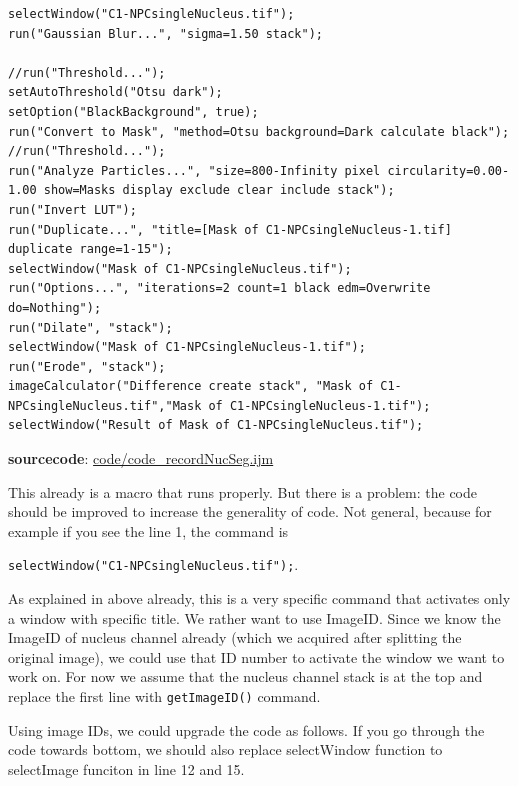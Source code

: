 \documentclass[11pt,a4paper,oneside]{report}
\newcommand{\ilcom}[1]{\texttt{\small#1}}
\begin{document}
\begin{lstlisting}
selectWindow("C1-NPCsingleNucleus.tif");
run("Gaussian Blur...", "sigma=1.50 stack");

//run("Threshold...");
setAutoThreshold("Otsu dark");
setOption("BlackBackground", true);
run("Convert to Mask", "method=Otsu background=Dark calculate black");
//run("Threshold...");
run("Analyze Particles...", "size=800-Infinity pixel circularity=0.00-1.00 show=Masks display exclude clear include stack");
run("Invert LUT");
run("Duplicate...", "title=[Mask of C1-NPCsingleNucleus-1.tif] duplicate range=1-15");
selectWindow("Mask of C1-NPCsingleNucleus.tif");
run("Options...", "iterations=2 count=1 black edm=Overwrite do=Nothing");
run("Dilate", "stack");
selectWindow("Mask of C1-NPCsingleNucleus-1.tif");
run("Erode", "stack");
imageCalculator("Difference create stack", "Mask of C1-NPCsingleNucleus.tif","Mask of C1-NPCsingleNucleus-1.tif");
selectWindow("Result of Mask of C1-NPCsingleNucleus.tif");

\end{lstlisting}
\textbf{sourcecode}: \href{http://www.example.com/contents}{code/code\_recordNucSeg.ijm}

This already is a macro that runs properly. But there is a problem: the code should be improved to increase the generality of code. Not general, because for example if you see the line 1, the command is 

\ilcom{selectWindow("C1-NPCsingleNucleus.tif");}. 


As explained in above already, this is a very specific command that activates only a window with specific title. We rather want to use ImageID. Since we know the ImageID of nucleus channel already (which we acquired after splitting the original image), we could use that ID number to activate the window we want to work on. For now we assume that the nucleus channel stack is at the top and replace the first line with \ilcom{getImageID()} command. 

Using image IDs, we could upgrade the code as follows.  If you go through the code towards bottom, we should also replace selectWindow function to selectImage funciton in line 12 and 15.
\end{document}
